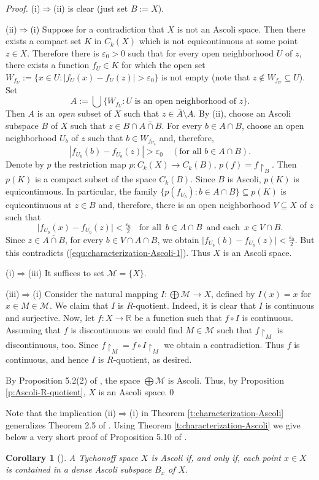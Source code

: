 \documentclass[preprint,11pt]{elsarticle}
\newtheorem{corollary}[theorem]{Corollary}
\numberwithin{equation}{section}
\numberwithin{theorem}{section}
\newcommand{\e}{\varepsilon}
\newcommand{\IR}{\mathbb{R}}
\newcommand{\Ra}{\Rightarrow}
\newcommand{\CC}{C_k}
\begin{document}
\begin{proof}
(i)$\Ra$(ii) is clear (just set $B:=X$).

(ii)$\Ra$(i) Suppose for a contradiction that $X$ is not an Ascoli space. Then there exists a compact set $K$ in $\CC(X)$ which is not equicontinuous at some point $z\in X$. Therefore there is $\e_0 >0$ such that for every open neighborhood $U$ of $z$, there exists a function $f_U\in K$ for which the open set $W_{f_U} :=\{ x\in U: | f_U (x)- f_U(z)|> \e_0\}$ is not empty (note that $z\not\in W_{f_U} \subseteq U$). Set
\[
A:= \bigcup\{ W_{f_U}: U \mbox{ is an open neighborhood of } z\}.
\]
Then $A$ is an {\em open} subset of $X$ such that $z\in\overline{A}\setminus A$.
By (ii), choose an Ascoli subspace $B$ of $X$ such that $z\in B\cap \overline{A\cap B}$.
For every $b\in A\cap B$, choose an open neighborhood $U_b$ of $z$ such that $b\in W_{f_{U_b}}$ and, therefore,
\begin{equation} \label{equ:characterization-Ascoli-1}
| f_{U_b} (b)- f_{U_b}(z)|> \e_0 \quad (\mbox{for all } b\in A\cap B).
\end{equation}
Denote by $p$ the restriction map $p: \CC(X)\to \CC(B),\, p(f)=f{\restriction}_{B}$. Then $p(K)$ is a compact subset of the space $\CC(B)$. Since $B$ is Ascoli, $p(K)$ is equicontinuous. In particular, the family $\{ p(f_{U_b}): b\in A\cap B\}\subseteq p(K)$ is equicontinuous at $z\in B$ and, therefore, there is an open neighborhood $V\subseteq X$ of $z$ such that
\[
\big| f_{U_b} (x) - f_{U_b}(z) \big| <\tfrac{\e_0}{2} \; \; \mbox{ for all } \, b\in A\cap B \, \mbox{ and each } \, x\in V\cap B.
\]
Since $z\in \overline{A\cap B}$, for every $b\in V\cap A\cap B$, we obtain
$
\big| f_{U_b} (b) - f_{U_b}(z) \big| <\frac{\e_0}{2}.
$
But this contradicts (\ref{equ:characterization-Ascoli-1}). Thus $X$ is an Ascoli space.
\smallskip

(i)$\Ra$(iii) It suffices to set $\mathcal{M}=\{X\}$.
\smallskip

(iii)$\Ra$(i) Consider the natural mapping $I:\bigoplus \mathcal{M}\to X$, defined by $I(x)=x$ for $x\in M\in \mathcal{M}$. We claim that $I$ is $R$-quotient. Indeed, it is clear that $I$ is continuous and surjective. Now, let $f:X\to\IR$ be a function such that $f\circ I$ is continuous. Assuming that $f$ is discontinuous we could find $M\in\mathcal{M}$ such that $f{\restriction}_M$ is discontinuous, too. Since $f{\restriction}_M=f\circ I{\restriction}_M$ we obtain a contradiction. Thus $f$ is continuous, and hence $I$ is $R$-quotient, as desired.

By Proposition 5.2(2) of \cite{BG}, the space  $\bigoplus\mathcal{M}$ is Ascoli. Thus, by Proposition \ref{p:Ascoli-R-quotient}, $X$ is an Ascoli space.\qed
\end{proof}
Note that the implication (ii)$\Ra$(i) in Theorem \ref{t:characterization-Ascoli} generalizes Theorem 2.5 of \cite{Gabr-B1}.
Using Theorem \ref{t:characterization-Ascoli} we give below  a very short proof of Proposition 5.10 of \cite{BG}.
\begin{corollary}[\cite{BG}] \label{c:dense-Ascoli}
A Tychonoff space $X$ is Ascoli if, and only if, each point $x\in X$ is contained in a dense Ascoli subspace $B_x$ of $X$.
\end{corollary}
\end{document}
